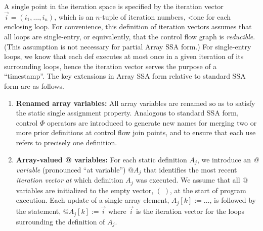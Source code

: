 A single point in the
iteration space is specified by the iteration vector
$\vec{i} = (i_1, \ldots, i_n)$, which is
an 
$n$-tuple of iteration numbers,
<one for each enclosing loop. 
For convenience, this definition of iteration vectors assumes that  
all loops are single-entry, or equivalently, that the control flow graph is {\it reducible}.
(This assumption is not necessary
for partial Array SSA form.)
For single-entry loops, we know that each def executes at most
once in a given iteration of its surrounding loops, hence the iteration vector
serves the purpose of a ``timestamp''.
The key extensions in Array SSA form relative to standard SSA form are as
follows.



\begin{enumerate}
\item {\bf Renamed array variables:}
All array variables are renamed so as to 
satisfy the static single assignment property.  Analogous to standard SSA
form, control $\Phi$ operators are introduced to generate new names
for merging two or more prior definitions at control flow join points, and to ensure that each use
refers to precisely one definition.

\item {\bf Array-valued @ variables:}
For each static definition
$A_j$, we introduce an {\em @ variable} (pronounced ``at variable'')
$@A_j$ that identifies
the most recent {\em iteration vector} {\it
at} which definition $A_j$ was executed.
We assume that all @ variables are initialized to the empty
vector, $ (\;)$, at the start of program execution.  
Each update of a single array element, $A_j[k] := \ldots$, 
is followed by the statement, $@A_j[k] := \vec{i}$
where $\vec{i}$ is the iteration vector for the loops surrounding
the definition of $A_j$.



\end{enumerate}
